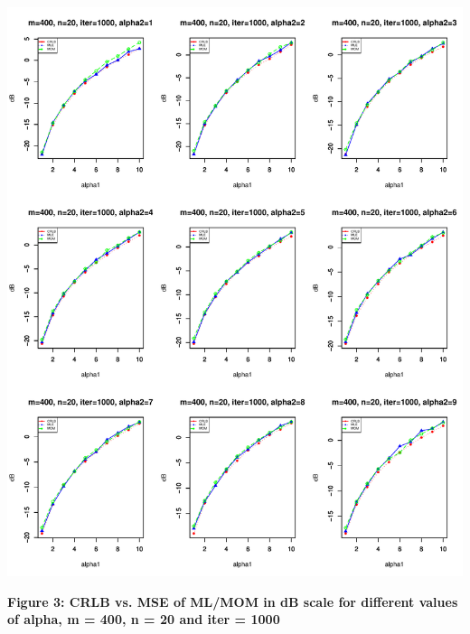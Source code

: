 \documentclass{article} %
\newcommand{\?}{\stackrel{?}{=}}
\begin{document}
\includegraphics[scale=0.8]{plt_n400_m20_ik2.pdf}
\begin{center}
\textbf{Figure 3: CRLB vs. MSE of ML/MOM in dB scale for different values of alpha, m = 400, n = 20 and iter = 1000}
\end{center}
\end{document}
